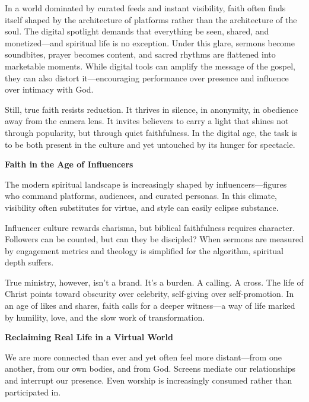 \documentclass[a4paper,11pt]{book}
\begin{document}
In a world dominated by curated feeds and instant visibility, faith often finds itself shaped by the architecture of platforms rather than the architecture of the soul. The digital spotlight demands that everything be seen, shared, and monetized—and spiritual life is no exception. Under this glare, sermons become soundbites, prayer becomes content, and sacred rhythms are flattened into marketable moments. While digital tools can amplify the message of the gospel, they can also distort it—encouraging performance over presence and influence over intimacy with God.

Still, true faith resists reduction. It thrives in silence, in anonymity, in obedience away from the camera lens. It invites believers to carry a light that shines not through popularity, but through quiet faithfulness. In the digital age, the task is to be both present in the culture and yet untouched by its hunger for spectacle.

\begin{center}
\textbf{Faith in the Age of Influencers\\}
\end{center}

The modern spiritual landscape is increasingly shaped by influencers—figures who command platforms, audiences, and curated personas. In this climate, visibility often substitutes for virtue, and style can easily eclipse substance.

Influencer culture rewards charisma, but biblical faithfulness requires character. Followers can be counted, but can they be discipled? When sermons are measured by engagement metrics and theology is simplified for the algorithm, spiritual depth suffers.

True ministry, however, isn’t a brand. It’s a burden. A calling. A cross. The life of Christ points toward obscurity over celebrity, self-giving over self-promotion. In an age of likes and shares, faith calls for a deeper witness—a way of life marked by humility, love, and the slow work of transformation.

\begin{center}
\textbf{Reclaiming Real Life in a Virtual World\\}
\end{center}

We are more connected than ever and yet often feel more distant—from one another, from our own bodies, and from God. Screens mediate our relationships and interrupt our presence. Even worship is increasingly consumed rather than participated in.
\end{document}
